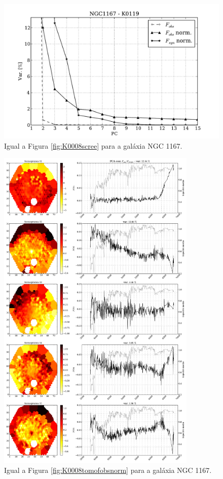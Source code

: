 \begin{figure}
    \includegraphics[height=0.33\textheight]{figuras/K0119-screetest.pdf}
    \caption[Scree test comparativo entre 3 PCAs - NGC 1167.]
    {Igual a Figura \ref{fig:K0008scree} para a galáxia NGC 1167.}
    \label{fig:K0119scree}
\end{figure}

\begin{figure}
    \includegraphics[width=0.85\textwidth]{figuras/K0119-tomo-obs-norm.pdf}
    \caption[Tomogramas de 1 a 5 para o cubo $F_{obs}$ norm. - NGC 1167.]
    {Igual a Figura \ref{fig:K0008tomofobsnorm} para a galáxia NGC 1167.}
    \label{fig:K0119tomofobsnorm}
\end{figure}

